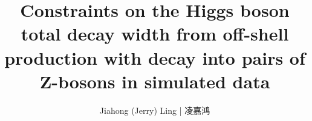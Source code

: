 

\title{Constraints on the Higgs boson total decay width from off-shell production with decay into
pairs of Z-bosons in simulated data}

\author{Jiahong (Jerry) Ling | 凌嘉鸿}

   


